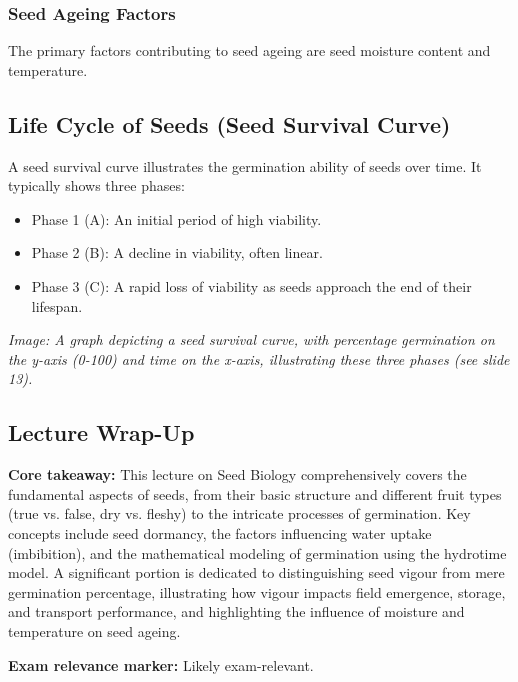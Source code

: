 \subsubsection{Seed Ageing Factors} 
The primary factors contributing to seed ageing are seed moisture content and temperature.

\subsection{Life Cycle of Seeds (Seed Survival Curve)} 
A seed survival curve illustrates the germination ability of seeds over time. It typically shows three phases: 
\begin{itemize} 
    \item Phase 1 (A): An initial period of high viability. 
    \item Phase 2 (B): A decline in viability, often linear. 
    \item Phase 3 (C): A rapid loss of viability as seeds approach the end of their lifespan. 
\end{itemize} 

\textit{Image: A graph depicting a seed survival curve, with percentage germination on the y-axis (0-100) and time on the x-axis, illustrating these three phases (see slide 13).}


\subsection*{Lecture Wrap-Up} 
\textbf{Core takeaway:} This lecture on Seed Biology comprehensively covers the fundamental aspects of seeds, from their basic structure and different fruit types (true vs. false, dry vs. fleshy) to the intricate processes of germination. Key concepts include seed dormancy, the factors influencing water uptake (imbibition), and the mathematical modeling of germination using the hydrotime model. A significant portion is dedicated to distinguishing seed vigour from mere germination percentage, illustrating how vigour impacts field emergence, storage, and transport performance, and highlighting the influence of moisture and temperature on seed ageing. 

\vspace{1em} 
\textbf{Exam relevance marker:} Likely exam-relevant.
